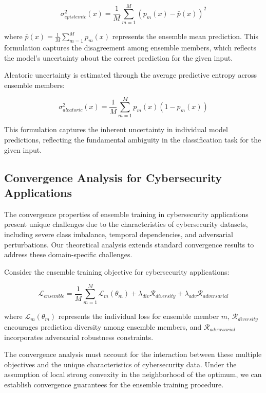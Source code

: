 \documentclass[journal]{IEEEtran}
\begin{document}
\begin{equation}
\sigma_{epistemic}^2(x) = \frac{1}{M} \sum_{m=1}^M (p_m(x) - \bar{p}(x))^2
\end{equation}

where $\bar{p}(x) = \frac{1}{M} \sum_{m=1}^M p_m(x)$ represents the ensemble mean prediction. This formulation captures the disagreement among ensemble members, which reflects the model's uncertainty about the correct prediction for the given input.

Aleatoric uncertainty is estimated through the average predictive entropy across ensemble members:

\begin{equation}
\sigma_{aleatoric}^2(x) = \frac{1}{M} \sum_{m=1}^M p_m(x)(1-p_m(x))
\end{equation}

This formulation captures the inherent uncertainty in individual model predictions, reflecting the fundamental ambiguity in the classification task for the given input.

\subsection{Convergence Analysis for Cybersecurity Applications}

The convergence properties of ensemble training in cybersecurity applications present unique challenges due to the characteristics of cybersecurity datasets, including severe class imbalance, temporal dependencies, and adversarial perturbations. Our theoretical analysis extends standard convergence results to address these domain-specific challenges.

Consider the ensemble training objective for cybersecurity applications:

\begin{equation}
\mathcal{L}_{ensemble} = \frac{1}{M} \sum_{m=1}^M \mathcal{L}_m(\theta_m) + \lambda_{div} \mathcal{R}_{diversity} + \lambda_{adv} \mathcal{R}_{adversarial}
\end{equation}

where $\mathcal{L}_m(\theta_m)$ represents the individual loss for ensemble member $m$, $\mathcal{R}_{diversity}$ encourages prediction diversity among ensemble members, and $\mathcal{R}_{adversarial}$ incorporates adversarial robustness constraints.

The convergence analysis must account for the interaction between these multiple objectives and the unique characteristics of cybersecurity data. Under the assumption of local strong convexity in the neighborhood of the optimum, we can establish convergence guarantees for the ensemble training procedure.
\end{document}
